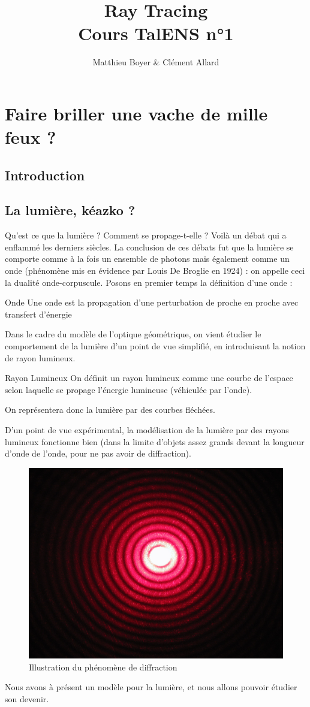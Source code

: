 \documentclass{cours}
\title{Ray Tracing\\ \small Cours TalENS n°1}
\author{Matthieu Boyer & Clément Allard}
\date{}
\begin{document}
	\section{Faire briller une vache de mille feux ?}
	\subsection{Introduction}
	\subsection{La lumière, kéazko ?}
	Qu'est ce que la lumière ? Comment se propage-t-elle ? Voilà un débat qui a enflammé les derniers siècles. La conclusion de ces débats fut que la lumière se comporte comme à la fois un ensemble de photons mais également comme un onde (phénomène mis en évidence par Louis De Broglie en 1924) : on appelle ceci la dualité onde-corpuscule. Posons en premier temps la définition d'une onde :
	\begin{définition}{Onde}{}
		Une onde est la propagation d'une perturbation de proche en proche avec transfert d'énergie
	\end{définition}
	Dans le cadre du modèle de l'optique géométrique, on vient étudier le comportement de la lumière d'un point de vue simplifié, en introduisant la notion de rayon lumineux.
	\begin{définition}{Rayon Lumineux}{}
		On définit un rayon lumineux comme une courbe de l'espace selon laquelle se propage l'énergie lumineuse (véhiculée par l'onde).
	\end{définition}
	On représentera donc la lumière par des courbes fléchées.
	\begin{remarque}{}{}
	D'un point de vue expérimental, la modélisation de la lumière par des rayons lumineux fonctionne bien (dans la limite d'objets assez grands devant la longueur d'onde de l'onde, pour ne pas avoir de diffraction).
	\end{remarque}{}{}
	\begin{figure}[H]
	\centering
	\includegraphics[scale=.08]{Diffraction.jpeg}
	\caption{Illustration du phénomène de diffraction}
	\end{figure}
	Nous avons à présent un modèle pour la lumière, et nous allons pouvoir étudier son devenir.
	
\end{document}
